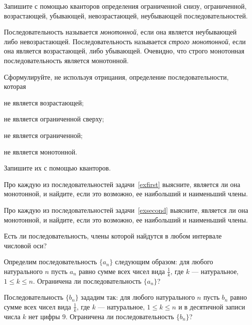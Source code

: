 \documentclass[a4paper, 12pt, num=24]{listok}
\begin{document}
\begin{problem}
	Запишите с помощью кванторов определения ограниченной снизу, ограниченной, возрастающей, убывающей, невозрастающей, неубывающей последовательностей.
\end{problem}
\begin{definition}
	Последовательность называется \textit{монотонной}, если она является неубывающей либо невозрастающей.
	Последовательность называется \textit{строго монотонной}, если она является возрастающей, либо убывающей.
	Очевидно, что строго монотонная последовательность является монотонной.
\end{definition}
\begin{problem}
	Сформулируйте, не используя отрицания, определение последовательности, которая
	\begin{probparts}
		\item не является возрастающей;
		\item не является ограниченной сверху;
		\item не является ограниченной;
		\item не является монотонной.
	\end{probparts}
	Запишите их с помощью кванторов.
\end{problem}
\begin{problem}
	Про каждую из последовательностей задачи~\ref{exfirst} выясните, является ли она монотонной, и найдите, если это возможно, ее наибольший и наименьший члены.
\end{problem}
\begin{problem}
	Про каждую из последовательностей задачи~\ref{exsecond} выясните, является ли она монотонной, и найдите, если это возможно, ее наибольший и наименьший члены.
\end{problem}
\begin{problem}
	Есть ли последовательность, члены которой найдутся в любом интервале числовой оси?
\end{problem}
\begin{problem}
\begin{probparts}
	\item Определим последовательность $\{a_n\}$ следующим образом:
	для любого натурального $n$ пусть $a_n$ равно сумме всех чисел вида $\frac1k$, где $k$ --- натуральное, $1 \le k \le n$.
	Ограничена ли последовательность $\{a_n\}$?
	\item Последовательность $\{b_n\}$ зададим так: для любого натурального $n$ пусть $b_n$ равно сумме всех чисел вида $\frac1k$,
	где $k$ --- натуральное, $1 \le k \le n$ и в десятичной записи числа $k$ нет цифры $9$. Ограничена ли последовательность $\{b_n\}$?
\end{probparts}
\end{problem}
\end{document}
